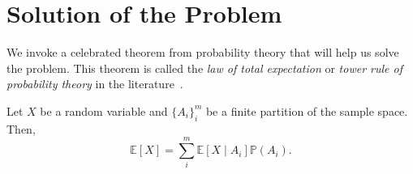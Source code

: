 \section{Solution of the Problem}
\label{sec:solution}


We invoke a celebrated theorem from probability theory that will help us solve
the problem. This theorem is called the \textit{law of total expectation} or
\textit{tower rule of probability theory} in the
literature~\cite{bertsekas2002introduction}.

\begin{thm} \label{thm:tower} Let $X$ be a random variable and
    $\{A_i\}_i^m$ be a finite partition of the sample space. Then, 
    \[ \mathbb{E}[X] = \sum_i^m \mathbb{E}\left[ X \mid A_i \right]
    \mathbb{P}(A_i). \]
\end{thm}
%

